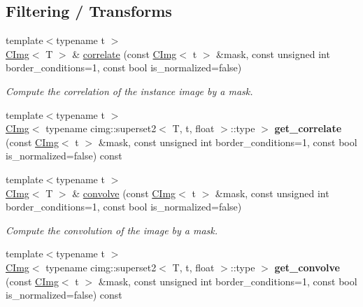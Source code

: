 \subsection*{Filtering / Transforms}
\label{_amgrp88e814e1d59aa2366da9e29cae34573c}
 \begin{DoxyCompactItemize}
\item 
{\footnotesize template$<$typename t $>$ }\\\hyperlink{structcimg__library_1_1CImg}{CImg}$<$ T $>$ \& \hyperlink{structcimg__library_1_1CImg_a31cb810b62c2d45d89d559f9b37059b3}{correlate} (const \hyperlink{structcimg__library_1_1CImg}{CImg}$<$ t $>$ \&mask, const unsigned int border\_\-conditions=1, const bool is\_\-normalized=false)
\begin{DoxyCompactList}\small\item\em Compute the correlation of the instance image by a mask. \item\end{DoxyCompactList}\item 
\hypertarget{structcimg__library_1_1CImg_a6f14b800ff2704a1d3ef6fd9349e1408}{
{\footnotesize template$<$typename t $>$ }\\\hyperlink{structcimg__library_1_1CImg}{CImg}$<$ typename cimg::superset2$<$ T, t, float $>$::type $>$ {\bfseries get\_\-correlate} (const \hyperlink{structcimg__library_1_1CImg}{CImg}$<$ t $>$ \&mask, const unsigned int border\_\-conditions=1, const bool is\_\-normalized=false) const }
\label{structcimg__library_1_1CImg_a6f14b800ff2704a1d3ef6fd9349e1408}

\item 
{\footnotesize template$<$typename t $>$ }\\\hyperlink{structcimg__library_1_1CImg}{CImg}$<$ T $>$ \& \hyperlink{structcimg__library_1_1CImg_acf2efb8768c7a62d89c489ffcf9acf6e}{convolve} (const \hyperlink{structcimg__library_1_1CImg}{CImg}$<$ t $>$ \&mask, const unsigned int border\_\-conditions=1, const bool is\_\-normalized=false)
\begin{DoxyCompactList}\small\item\em Compute the convolution of the image by a mask. \item\end{DoxyCompactList}\item 
\hypertarget{structcimg__library_1_1CImg_afd3b29cf3e63af6290d273addb060d45}{
{\footnotesize template$<$typename t $>$ }\\\hyperlink{structcimg__library_1_1CImg}{CImg}$<$ typename cimg::superset2$<$ T, t, float $>$::type $>$ {\bfseries get\_\-convolve} (const \hyperlink{structcimg__library_1_1CImg}{CImg}$<$ t $>$ \&mask, const unsigned int border\_\-conditions=1, const bool is\_\-normalized=false) const }
\label{structcimg__library_1_1CImg_afd3b29cf3e63af6290d273addb060d45}


\end{DoxyCompactItemize}
